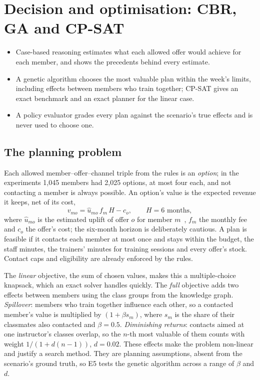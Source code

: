 \chapter{Decision and optimisation: CBR, GA and CP-SAT}
\label{ch:optimisation}

\begin{inbrief}
\begin{itemize}
  \item Case-based reasoning estimates what each allowed offer would achieve for each member, and shows the precedents behind every estimate.
  \item A genetic algorithm chooses the most valuable plan within the week's limits, including effects between members who train together; CP-SAT gives an exact benchmark and an exact planner for the linear case.
  \item A policy evaluator grades every plan against the scenario's true effects and is never used to choose one.
\end{itemize}
\end{inbrief}

\section{The planning problem}

Each allowed member--offer--channel triple from the rules is an \emph{option}; in the experiments 1,045 members had 2,025 options, at most four each, and not contacting a member is always possible. An option's value is the expected revenue it keeps, net of its cost,
\begin{equation}
  v_{mo} = \hat u_{mo}\, f_m\, H - c_o, \qquad H = 6 \text{ months},
  \label{eq:value}
\end{equation}
where $\hat u_{mo}$ is the estimated uplift of offer $o$ for member $m$~\cite{radcliffe2007uplift}, $f_m$ the monthly fee and $c_o$ the offer's cost; the six-month horizon is deliberately cautious. A plan is feasible if it contacts each member at most once and stays within the budget, the staff minutes, the trainers' minutes for training sessions and every offer's stock. Contact caps and eligibility are already enforced by the rules.

The \emph{linear} objective, the sum of chosen values, makes this a multiple-choice knapsack, which an exact solver handles quickly. The \emph{full} objective adds two effects between members using the class groups from the knowledge graph. \emph{Spillover}: members who train together influence each other, so a contacted member's value is multiplied by $(1 + \beta s_m)$, where $s_m$ is the share of their classmates also contacted and $\beta = 0.5$. \emph{Diminishing returns}: contacts aimed at one instructor's classes overlap, so the $n$-th most valuable of them counts with weight $1/(1 + d(n-1))$, $d = 0.02$. These effects make the problem non-linear and justify a search method. They are planning assumptions, absent from the scenario's ground truth, so E5 tests the genetic algorithm across a range of $\beta$ and $d$.

